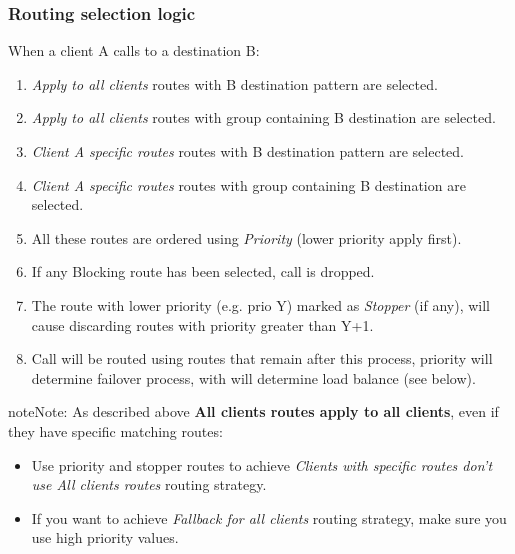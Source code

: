 \documentclass[letterpaper,10pt,english]{sphinxmanual}
\begin{document}
\subsubsection{Routing selection logic}
\label{administration_portal/brand/routing/outgoing_routings:routing-selection-logic}
When a client A calls to a destination B:
\begin{enumerate}
\item {} 
\emph{Apply to all clients} routes with B destination pattern are selected.

\item {} 
\emph{Apply to all clients} routes with group containing B destination are selected.

\item {} 
\emph{Client A specific routes} routes with B destination pattern are selected.

\item {} 
\emph{Client A specific routes} routes with group containing B destination are selected.

\item {} 
All these routes are ordered using \emph{Priority} (lower priority apply first).

\item {} 
If any Blocking route has been selected, call is dropped.

\item {} 
The route with lower priority (e.g. prio Y) marked as \emph{Stopper} (if any), will cause discarding routes with priority greater than Y+1.

\item {} 
Call will be routed using routes that remain after this process, priority will determine failover process, with will determine load balance (see below).

\end{enumerate}

\begin{notice}{note}{Note:}
As described above \textbf{All clients routes apply to all clients}, even if they have specific matching routes:
\begin{itemize}
\item {} 
Use priority and stopper routes to achieve \emph{Clients with specific routes don't use All clients routes} routing strategy.

\item {} 
If you want to achieve \emph{Fallback for all clients} routing strategy, make sure you use high priority values.

\end{itemize}
\end{notice}
\end{document}
